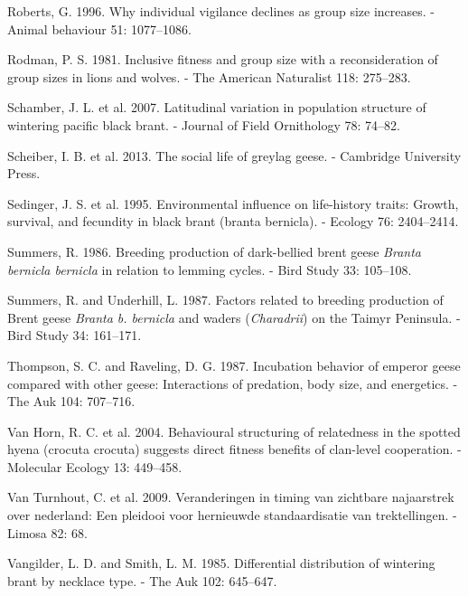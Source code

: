 \documentclass[10pt,twocolumn]{paper}
\begin{document}
\hypertarget{ref-roberts1996individual}{}
Roberts, G. 1996. Why individual vigilance declines as group size
increases. - Animal behaviour 51: 1077--1086.

\hypertarget{ref-rodman1981lions}{}
Rodman, P. S. 1981. Inclusive fitness and group size with a
reconsideration of group sizes in lions and wolves. - The American
Naturalist 118: 275--283.

\hypertarget{ref-JOFO:JOFO087}{}
Schamber, J. L. et al. 2007. Latitudinal variation in population
structure of wintering pacific black brant. - Journal of Field
Ornithology 78: 74--82.

\hypertarget{ref-scheiber2013social}{}
Scheiber, I. B. et al. 2013. The social life of greylag geese. -
Cambridge University Press.

\hypertarget{ref-ECY:ECY19957682404}{}
Sedinger, J. S. et al. 1995. Environmental influence on life-history
traits: Growth, survival, and fecundity in black brant (branta
bernicla). - Ecology 76: 2404--2414.

\hypertarget{ref-summers1986breeding}{}
Summers, R. 1986. Breeding production of dark-bellied brent geese
\emph{Branta bernicla bernicla} in relation to lemming cycles. - Bird
Study 33: 105--108.

\hypertarget{ref-summers1987factors}{}
Summers, R. and Underhill, L. 1987. Factors related to breeding
production of Brent geese \emph{Branta b. bernicla} and waders
(\emph{Charadrii}) on the Taimyr Peninsula. - Bird Study 34: 161--171.

\hypertarget{ref-thompson1987emperor}{}
Thompson, S. C. and Raveling, D. G. 1987. Incubation behavior of emperor
geese compared with other geese: Interactions of predation, body size,
and energetics. - The Auk 104: 707--716.

\hypertarget{ref-MEC:MEC2071}{}
Van Horn, R. C. et al. 2004. Behavioural structuring of relatedness in
the spotted hyena (crocuta crocuta) suggests direct fitness benefits of
clan-level cooperation. - Molecular Ecology 13: 449--458.

\hypertarget{ref-van2009veranderingen}{}
Van Turnhout, C. et al. 2009. Veranderingen in timing van zichtbare
najaarstrek over nederland: Een pleidooi voor hernieuwde standaardisatie
van trektellingen. - Limosa 82: 68.

\hypertarget{ref-vangilder1985differential}{}
Vangilder, L. D. and Smith, L. M. 1985. Differential distribution of
wintering brant by necklace type. - The Auk 102: 645--647.
\end{document}
